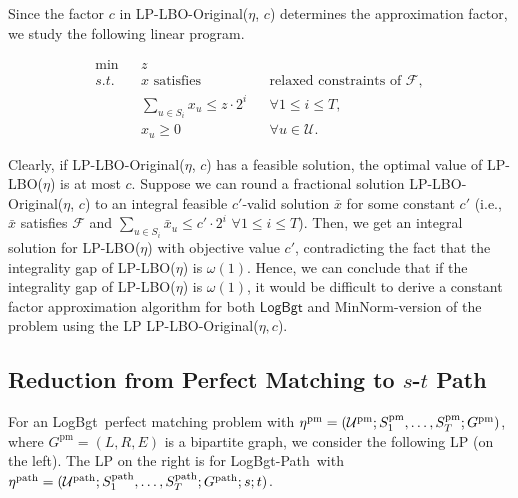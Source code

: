 \documentclass[11pt,a4paper]{article} \usepackage{enumitem}
\newcommand{\calF}{\mathcal{F}}
\newcommand{\calU}{\mathcal{U}}
\newcommand{\minnorm}{\textsf{MinNorm}}
\newcommand{\LBO}{\textsf{LogBgt}}
\newcommand{\LBOpath}{\textsf{LogBgt-Path}}
\newcommand{\pathU}{\operatorname{\calU^{path}}}
\newcommand{\pathS}[1]{\ifx\relax#1\relax
    S^{\operatorname{path}} \else
    S^{\operatorname{path}}_{#1} \fi
}
\newcommand{\patheta}{\operatorname{\eta^{path}}}
\newcommand{\pathG}{G^{\operatorname{path}}}
\newcommand{\pmU}{\operatorname{\calU^{pm}}}
\newcommand{\pmS}[1]{\ifx\relax#1\relax
    S^{\operatorname{pm}} \else
    S^{\operatorname{pm}}_{#1} \fi
}
\newcommand{\pmeta}{\operatorname{\eta^{pm}}}
\newcommand{\pmG}{G^{\operatorname{pm}}}
\theoremstyle{definition}
\begin{document}
Since the factor $c$ in LP-LBO-Original($\eta$, $c$)
determines the approximation factor,
we study  
the following linear program.

\begin{equation}
\begin{aligned}
    \min && z \\
    s.t. && \text{$x$ satisfies} && \text{relaxed constraints of } \calF, \\
    && \sum_{u \in S_i} x_u \leq z \cdot 2^i && \forall 1 \leq i \leq T, \\
    && x_u \geq 0 && \forall u \in \calU.
\end{aligned}
\tag{LP-LBO($\eta$)}
\label{LP-LBO}
\end{equation}

Clearly, if LP-LBO-Original($\eta$, $c$)
has a feasible solution, the optimal
value of LP-LBO($\eta$) is at most $c$.
Suppose we can round 
a fractional solution LP-LBO-Original($\eta$, $c$)
to an integral feasible 
$c'$-valid solution 
$\bar{x}$ 
for some constant $c'$
(i.e., $\bar{x}$ satisfies $\calF$ and 
$\sum_{u \in S_i} \bar{x}_u \leq c' \cdot 2^i \,\, \forall 1 \leq i \leq T
$).
Then, we get an 
integral solution for 
LP-LBO($\eta$) with objective value $c'$, contradicting the fact that
the integrality gap of LP-LBO($\eta$) is $\omega(1)$.
Hence, we can conclude that 
if the integrality gap of LP-LBO($\eta$) is $\omega(1)$,
it would be difficult to derive a constant factor approximation algorithm for both $\LBO$ and \minnorm-version of the problem
using the LP LP-LBO-Original($\eta, c$).


\subsection{Reduction from Perfect Matching to $s$-$t$ Path}\label{sec:integralgap-1}
For an \LBO\ perfect matching problem with $\pmeta = (\pmU; \pmS{1}, \ldots, \pmS{T}; \pmG)$, where $\pmG = (L, R, E)$ is a bipartite graph, we consider the following LP (on the left). The LP on the right is for \LBOpath\ with $\patheta = (\pathU; \pathS{1}, \ldots, \pathS{T}; \pathG; s; t)$.
\end{document}
